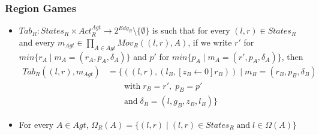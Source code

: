 \documentclass{beamer}
\begin{document}
\begin{frame}
\frametitle{Region Games}
  \begin{itemize}
\item $Tab_{R}: States_{R} \times Act_{R}^{Agt} \rightarrow 2^{Edg_{R}} \setminus \lbrace \emptyset \rbrace$ is such that for every $(l, r) \in States_{R}$ and every $m_{Agt} \in \prod \limits_{A \in Agt} Mov_{R}((l, r), A)$, if we write $r'$ for $min\lbrace r_{A} \; \vert \; m_{A} = (r_{A}, p_{A}, \delta_{A}) \rbrace$ and $p'$ for $min\lbrace p_{A} \; \vert \; m_{A} = (r', p_{A}, \delta_{A}) \rbrace$, then
\begin{align*}
Tab_{R}((l, r), m_{Agt}) &= \Big\lbrace ((l, r), (l_{B}, [z_{B} \leftarrow 0]r_{B})) \; \Big\vert \; m_{B} = (r_{B}, p_{B}, \delta_{B})\\
&\qquad \text{with} \; r_{B} = r', \; p_{B} = p'\\
&\qquad \text{and} \; \delta_{B} = (l, g_{B}, z_{B}, l_{B}) \Big\rbrace
\end{align*}
\item For every $A \in Agt$, $\Omega_{R}(A) = \lbrace (l, r) \; \vert \; (l, r) \in States_{R} \; \text{and} \; l \in \Omega(A) \rbrace$
  \end{itemize}
\end{frame}
\end{document}
